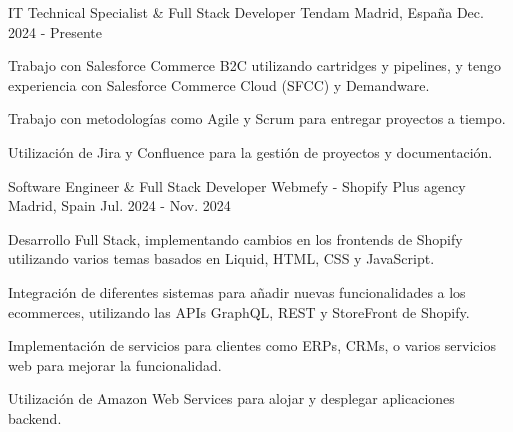 

\begin{cventries}

\vspace{3.5mm}
\cventry
    {IT Technical Specialist \& Full Stack Developer} %
    {Tendam} %
    {Madrid, España} %
    {Dec. 2024 - Presente} %
    {
      \begin{cvitems} %
        \item {Trabajo con Salesforce Commerce B2C utilizando cartridges y pipelines, y tengo experiencia con Salesforce Commerce Cloud (SFCC) y Demandware.}
        \item {Trabajo con metodologías como Agile y Scrum para entregar proyectos a tiempo.}
        \item {Utilización de Jira y Confluence para la gestión de proyectos y documentación.}
      \end{cvitems}
    }
  \vspace{5.5mm}
\cventry
    {Software Engineer \& Full Stack Developer} %
    {Webmefy - Shopify Plus agency} %
    {Madrid, Spain} %
    {Jul. 2024 - Nov. 2024} %
    {
      \begin{cvitems} %
        \item {Desarrollo Full Stack, implementando cambios en los frontends de Shopify utilizando varios temas basados en Liquid, HTML, CSS y JavaScript.}
        \item {Integración de diferentes sistemas para añadir nuevas funcionalidades a los ecommerces, utilizando las APIs GraphQL, REST y StoreFront de Shopify.}
        \item {Implementación de servicios para clientes como ERPs, CRMs, o varios servicios web para mejorar la funcionalidad.}
        \item {Utilización de Amazon Web Services para alojar y desplegar aplicaciones backend.}

\end{cvitems}}
\end{cventries}
